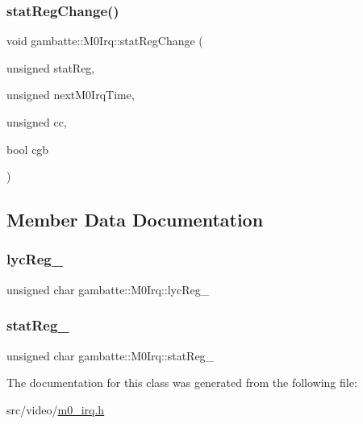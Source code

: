 \mbox{\label{classgambatte_1_1M0Irq_aa75e2697d3ceea08246e1f6e9fd05eea}} 
\subsubsection{\texorpdfstring{stat\+Reg\+Change()}{statRegChange()}}
{\footnotesize\ttfamily void gambatte\+::\+M0\+Irq\+::stat\+Reg\+Change (\begin{DoxyParamCaption}\item[{unsigned}]{stat\+Reg,  }\item[{unsigned}]{next\+M0\+Irq\+Time,  }\item[{unsigned}]{cc,  }\item[{bool}]{cgb }\end{DoxyParamCaption})\hspace{0.3cm}{\ttfamily [inline]}}



\subsection{Member Data Documentation}
\mbox{\label{classgambatte_1_1M0Irq_a966c4c53ab37b6eaf71ceea852f9b89f}} 
\subsubsection{\texorpdfstring{lyc\+Reg\+\_\+}{lycReg\_}}
{\footnotesize\ttfamily unsigned char gambatte\+::\+M0\+Irq\+::lyc\+Reg\+\_\+\hspace{0.3cm}{\ttfamily [private]}}

\mbox{\label{classgambatte_1_1M0Irq_adfa7fb60ef9478d0e2abc29d9c0c0271}} 
\subsubsection{\texorpdfstring{stat\+Reg\+\_\+}{statReg\_}}
{\footnotesize\ttfamily unsigned char gambatte\+::\+M0\+Irq\+::stat\+Reg\+\_\+\hspace{0.3cm}{\ttfamily [private]}}



The documentation for this class was generated from the following file\+:\begin{DoxyCompactItemize}
\item 
src/video/\hyperlink{m0__irq_8h}{m0\+\_\+irq.\+h}\end{DoxyCompactItemize}
